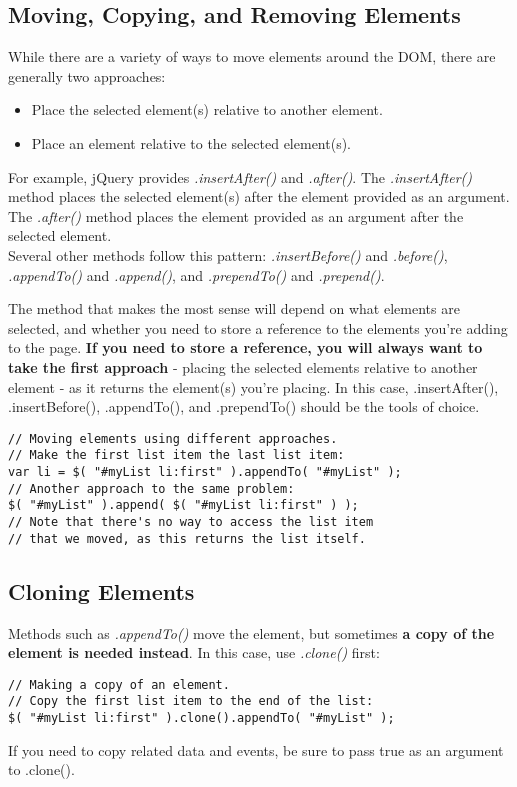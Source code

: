 \documentclass[10pt,letterpaper]{book}
\begin{document}
\subsection{Moving, Copying, and Removing Elements}
While there are a variety of ways to move elements around the DOM, there are generally two approaches:
\begin{itemize}
\item Place the selected element(s) relative to another element.
\item Place an element relative to the selected element(s).
\end{itemize}
For example, jQuery provides \textit{.insertAfter()} and \textit{.after()}. The \textit{.insertAfter()} method places the selected element(s) after the element provided as an argument. The \textit{.after()} method places the element provided as an argument after the selected element.\\
Several other methods follow this pattern: \textit{.insertBefore()} and \textit{.before()}, \textit{.appendTo()} and \textit{.append()}, and \textit{.prependTo()} and \textit{.prepend()}.

The method that makes the most sense will depend on what elements are selected, and whether you need to store a reference to the elements you're adding to the page. \textbf{If you need to store a reference, you will always want to take the first approach} - placing the selected elements relative to another element - as it returns the element(s) you're placing. In this case, .insertAfter(), .insertBefore(), .appendTo(), and .prependTo() should be the tools of choice.
\begin{lstlisting}
// Moving elements using different approaches.
// Make the first list item the last list item:
var li = $( "#myList li:first" ).appendTo( "#myList" );
// Another approach to the same problem:
$( "#myList" ).append( $( "#myList li:first" ) );
// Note that there's no way to access the list item
// that we moved, as this returns the list itself.
\end{lstlisting}
\subsection{Cloning Elements}
Methods such as \textit{.appendTo()} move the element, but sometimes \textbf{a copy of the element is needed instead}. In this case, use \textit{.clone()} first:
\begin{lstlisting}
// Making a copy of an element.
// Copy the first list item to the end of the list:
$( "#myList li:first" ).clone().appendTo( "#myList" );
\end{lstlisting}
If you need to copy related data and events, be sure to pass true as an argument to .clone().
\end{document}
